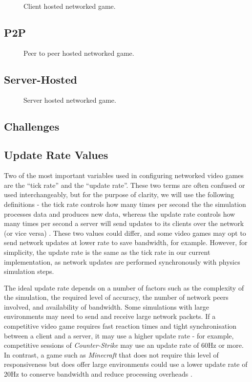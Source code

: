 \begin{figure}
	\centering
	
	\caption{Client hosted networked game.}
\end{figure}

\subsection{P2P}

\begin{figure}
	\centering
	
	\caption{Peer to peer hosted networked game.}
\end{figure}

\subsection{Server-Hosted}

\begin{figure}
	\centering
	
	\caption{Server hosted networked game.}
\end{figure}

\subsection{Challenges}

\subsection{Update Rate Values} \label{update-rate-test-values}

Two of the most important variables used in configuring networked video games are the ``tick rate'' and the ``update rate''. These two terms are often confused or used interchangeably, but for the purpose of clarity, we will use the following definitions - the tick rate controls how many times per second the the simulation processes data and produces new data, whereas the update rate controls how many times per second a server will send updates to its clients over the network (or vice versa) \cite{NetcodeBattlenonsense}. These two values could differ, and some video games may opt to send network updates at lower rate to save bandwidth, for example. However, for simplicity, the update rate is the same as the tick rate in our current implementation, as network updates are performed synchronously with physics simulation steps.

The ideal update rate depends on a number of factors such as the complexity of the simulation, the required level of accuracy, the number of network peers involved, and availability of bandwidth. Some simulations with large environments may need to send and receive large network packets. If a competitive video game requires fast reaction times and tight synchronisation between a client and a server, it may use a higher update rate - for example, competitive sessions of \textit{Counter-Strike} may use an update rate of 60Hz or more. In contrast, a game such as \textit{Minecraft} that does not require this level of responsiveness but does offer large environments could use a lower update rate of 20Hz to conserve bandwidth and reduce processing overheads \cite{lee2015evaluation}.

